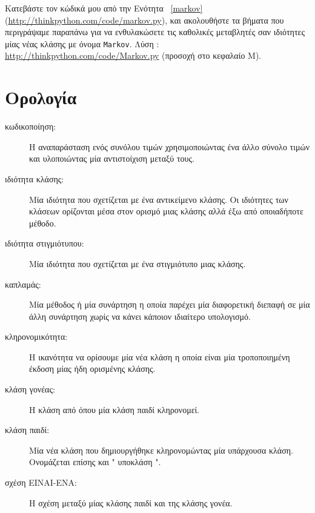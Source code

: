 \documentclass[10pt]{book}
\begin{document}
\begin{exercise}

Κατεβάστε τον κώδικά μου από την Ενότητα~ \ref{markov} (\url{http://thinkpython.com/code/markov.py}),  και ακολουθήστε τα βήματα που 
περιγράψαμε παραπάνω για να ενθυλακώσετε τις καθολικές μεταβλητές σαν ιδιότητες μίας νέας 
κλάσης με όνομα  {\tt Markov}.  Λύση : \url{http://thinkpython.com/code/Markov.py} (προσοχή στο κεφαλαίο Μ).

\end{exercise}




\section{Ορολογία}

\begin{description}

\item[κωδικοποίηση:]  Η αναπαράσταση ενός συνόλου τιμών χρησιμοποιώντας ένα άλλο 
σύνολο τιμών και υλοποιώντας μία αντιστοίχιση μεταξύ τους.

\item[ιδιότητα κλάσης:] Μία ιδιότητα που σχετίζεται με ένα αντικείμενο κλάσης.  Οι 
ιδιότητες των κλάσεων ορίζονται μέσα στον ορισμό μιας κλάσης αλλά έξω από οποιαδήποτε 
μέθοδο.

\item[ιδιότητα στιγμιότυπου:] Μία ιδιότητα που σχετίζεται με ένα στιγμιότυπο μιας κλάσης.

\item[καπλαμάς:] Μία μέθοδος ή μία συνάρτηση η οποία παρέχει μία διαφορετική 
διεπαφή σε μία άλλη συνάρτηση χωρίς να κάνει κάποιον ιδιαίτερο υπολογισμό.

\item[κληρονομικότητα:] Η ικανότητα να ορίσουμε μία νέα κλάση η οποία είναι 
μία τροποποιημένη έκδοση μίας ήδη ορισμένης κλάσης.

\item[κλάση γονέας:] Η κλάση από όπου μία κλάση παιδί κληρονομεί.

\item[κλάση παιδί:] Μία νέα κλάση που δημιουργήθηκε κληρονομώντας μία υπάρχουσα κλάση. 
Ονομάζεται επίσης και  " υποκλάση ". 

\item[σχέση ΕΙΝΑΙ-ΕΝΑ:] Η σχέση μεταξύ μίας κλάσης παιδί και της κλάσης γονέα.


\end{description}
\end{document}
